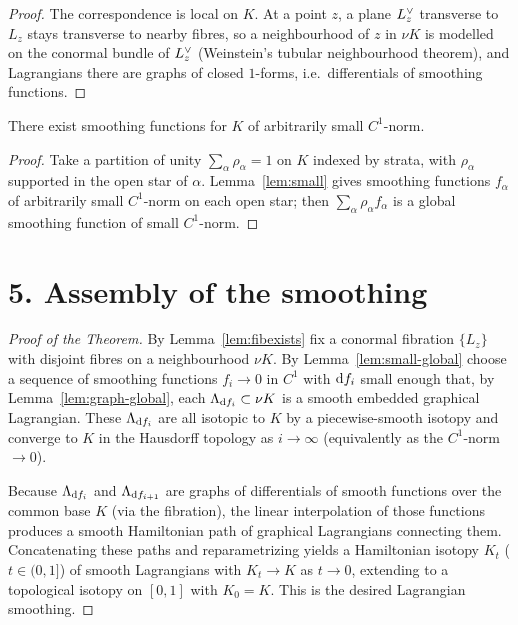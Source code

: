 \documentclass[11pt]{article}
\begin{document}
\begin{proof}
The correspondence is local on $K$. At a point $z$, a plane $L^{\vee}_z$ transverse
to $L_z$ stays transverse to nearby fibres, so a neighbourhood of $z$ in $\nu K$
is modelled on the conormal bundle of $L^{\vee}_z$ (Weinstein's tubular
neighbourhood theorem), and Lagrangians there are graphs of closed $1$-forms,
i.e.\ differentials of smoothing functions.
\end{proof}

\begin{qeightlemma}\label{lem:small-global}
There exist smoothing functions for $K$ of arbitrarily small $C^1$-norm.
\end{qeightlemma}

\begin{proof}
Take a partition of unity $\sum_\alpha\rho_\alpha=1$ on $K$ indexed by strata,
with $\rho_\alpha$ supported in the open star of $\alpha$. Lemma~\ref{lem:small}
gives smoothing functions $f_\alpha$ of arbitrarily small $C^1$-norm on each open
star; then $\sum_\alpha\rho_\alpha f_\alpha$ is a global smoothing function of
small $C^1$-norm.
\end{proof}

\section*{5. Assembly of the smoothing}

\begin{proof}[Proof of the Theorem]
By Lemma~\ref{lem:fibexists} fix a conormal fibration $\{L_z\}$ with disjoint
fibres on a neighbourhood $\nu K$. By Lemma~\ref{lem:small-global} choose a
sequence of smoothing functions $f_i\to 0$ in $C^1$ with $\mathrm d f_i$ small enough
that, by Lemma~\ref{lem:graph-global}, each $\Lambda_{\mathrm d f_i}\subset\nu K$ is a
smooth embedded graphical Lagrangian. These $\Lambda_{\mathrm d f_i}$ are all isotopic to
$K$ by a piecewise-smooth isotopy and converge to $K$ in the Hausdorff topology
as $i\to\infty$ (equivalently as the $C^1$-norm $\to0$).

Because $\Lambda_{\mathrm d f_i}$ and $\Lambda_{\mathrm d f_{i+1}}$ are graphs of differentials of
smooth functions over the common base $K$ (via the fibration), the linear
interpolation of those functions produces a smooth Hamiltonian path of graphical
Lagrangians connecting them. Concatenating these paths and reparametrizing yields
a Hamiltonian isotopy $K_t$ ($t\in(0,1]$) of smooth Lagrangians with $K_t\to K$
as $t\to0$, extending to a topological isotopy on $[0,1]$ with $K_0=K$. This is
the desired Lagrangian smoothing.
\end{proof}
\end{document}
